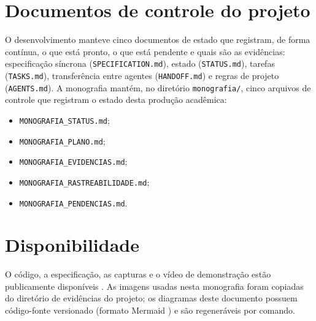 \section*{Documentos de controle do projeto}
\label{ap:controle}

O desenvolvimento manteve cinco documentos de estado que registram, de forma
contínua, o que está pronto, o que está pendente e quais são as evidências:
especificação síncrona (\texttt{SPECIFICATION.md}), estado
(\texttt{STATUS.md}), tarefas (\texttt{TASKS.md}), transferência entre agentes
(\texttt{HANDOFF.md}) e regras de projeto (\texttt{AGENTS.md}). A monografia
mantém, no diretório \texttt{monografia/}, cinco arquivos de controle que
registram o estado desta produção acadêmica:

\begin{itemize}
  \item \texttt{MONOGRAFIA\_STATUS.md};
  \item \texttt{MONOGRAFIA\_PLANO.md};
  \item \texttt{MONOGRAFIA\_EVIDENCIAS.md};
  \item \texttt{MONOGRAFIA\_RASTREABILIDADE.md};
  \item \texttt{MONOGRAFIA\_PENDENCIAS.md}.
\end{itemize}

\section*{Disponibilidade}
\label{ap:disponibilidade}

O código, a especificação, as capturas e o vídeo de demonstração estão
publicamente disponíveis \cite{lab404repo,lab404video}. As imagens usadas
nesta monografia foram copiadas do diretório de evidências do projeto; os
diagramas deste documento possuem código-fonte versionado (formato Mermaid
\cite{mermaid2026}) e são regeneráveis por comando.
